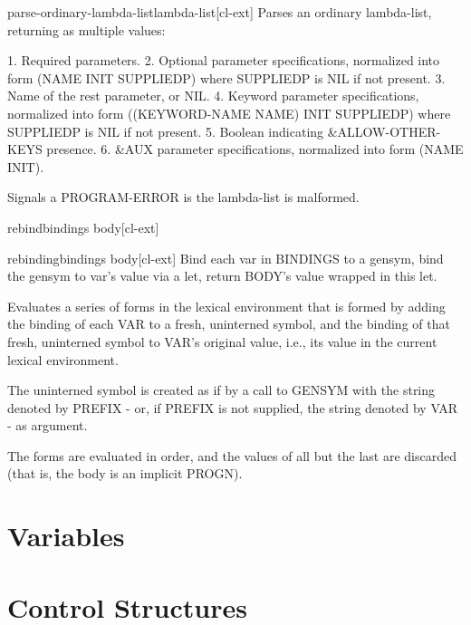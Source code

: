 \documentclass[10pt,english]{book}
\begin{document}
\begin{function}{parse-ordinary-lambda-list}{lambda-list}[cl-ext]
  Parses an ordinary lambda-list, returning as multiple values:

 1. Required parameters.
 2. Optional parameter specifications, normalized into form (NAME INIT SUPPLIEDP)
    where SUPPLIEDP is NIL if not present.
 3. Name of the rest parameter, or NIL.
 4. Keyword parameter specifications, normalized into form ((KEYWORD-NAME NAME) INIT SUPPLIEDP)
    where SUPPLIEDP is NIL if not present.
 5. Boolean indicating \&ALLOW-OTHER-KEYS presence.
 6. \&AUX parameter specifications, normalized into form (NAME INIT).

Signals a PROGRAM-ERROR is the lambda-list is malformed.
\end{function}

\begin{macro}{rebind}{bindings \body body}[cl-ext]
  
\end{macro}

\begin{macro}{rebinding}{bindings \body body}[cl-ext]
  Bind each var in BINDINGS to a gensym, bind the gensym to
var's value via a let, return BODY's value wrapped in this let.

Evaluates a series of forms in the lexical environment that is
formed by adding the binding of each VAR to a fresh, uninterned
symbol, and the binding of that fresh, uninterned symbol to VAR's
original value, i.e., its value in the current lexical
environment.

The uninterned symbol is created as if by a call to GENSYM with the
string denoted by PREFIX - or, if PREFIX is not supplied, the string
denoted by VAR - as argument.

The forms are evaluated in order, and the values of all but the last
are discarded (that is, the body is an implicit PROGN).
\end{macro}




\chapter{Variables}




\chapter{Control Structures}
\end{document}
